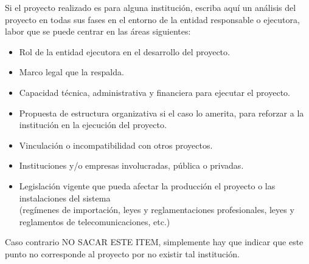 \justifying

Si el proyecto realizado es para alguna institución, escriba aquí un análisis del proyecto en todas sus fases en el entorno de la entidad responsable o ejecutora, labor que se puede centrar en las áreas siguientes:

\begin{itemize}
    \item Rol de la entidad ejecutora en el desarrollo del proyecto.
    \item Marco legal que la respalda.
    \item Capacidad técnica, administrativa y financiera para ejecutar el proyecto.
    \item Propuesta de estructura organizativa si el caso lo amerita, para reforzar a la institución en la ejecución del proyecto.
    \item Vinculación o incompatibilidad con otros proyectos.
    \item Instituciones y/o empresas involucradas, pública o privadas.
    \item Legislación vigente que pueda afectar la producción el proyecto o las instalaciones del sistema \\(regímenes de importación, leyes y reglamentaciones profesionales, leyes y reglamentos de telecomunicaciones, etc.)
\end{itemize}

Caso contrario NO SACAR ESTE ITEM, simplemente hay que indicar que este punto
no corresponde al proyecto por no existir tal institución.